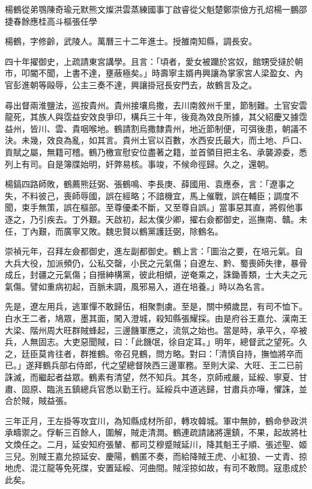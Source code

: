 
\begin{pinyinscope}
楊鶴從弟鶚陳奇瑜元默熊文燦洪雲蒸練國事丁啟睿從父魁楚鄭崇儉方孔炤楊一鵬邵捷春餘應桂高斗樞張任學

楊鶴，字修齡，武陵人。萬曆三十二年進士。授雒南知縣，調長安。

四十年擢御史，上疏請東宮講學。且言：「頃者，愛女被躪於宮奴，館甥受撻於朝市，叩閽不聞，上書不達，壅蔽極矣。」時壽寧主婿冉興讓為掌家宮人梁盈女、內官彭進朝等毆辱，公主三奏不達，興讓掛冠長安門去，故鶴言及之。

尋出督兩淮鹽法，巡按貴州。貴州接壤烏撒，去川南敘州千里，節制難。土官安雲龍死，其族人與霑益安效良爭印，構兵三十年，後竟為效良所據，其父紹慶又據霑益州，皆川、雲、貴咽喉地。鶴請割烏撒隸貴州，地近節制便，可弭後患，朝議不決。未幾，效良為亂，如其言。貴州土官以百數，水西安氏最大，而土地、戶口、貢賦之屬，無籍可稽。鶴乃檄宣慰安位盡著之籍，並首領目把主名、承襲源委，悉列上有司。自是簿牒始明，奸弊易核。事竣，不候命徑歸。久之，還朝。

楊鎬四路師敗，鶴薦熊廷弼、張鶴鳴、李長庚、薛國用、袁應泰，言：「遼事之失，不料彼己，喪師辱國，誤在經略；不諳機宜，馬上催戰，誤在輔臣；調度不聞，束手無策，誤在樞部。至尊優柔不斷，又至尊自誤。」當事惡其直，將假他事逐之，乃引疾去。丁外艱。天啟初，起太僕少卿，擢右僉都御史，巡撫南、贛。未任，丁內艱，而廣寧又敗。魏忠賢以鶴黨護廷弼，除鶴名。

崇禎元年，召拜左僉都御史，進左副都御史。鶴上言：「圖治之要，在培元氣。自大兵大役，加派頻仍，公私交罄，小民之元氣傷；自遼左、黔、蜀喪師失律，暴骨成丘，封疆之元氣傷；自搢紳構黨，彼此相傾，逆奄乘之，誅鋤善類，士大夫之元氣傷。譬如重病初起，百脈未調，風邪易入，道在培養。」時以為名言。

先是，遼左用兵，逃軍憚不敢歸伍，相聚剽虜。至是，關中頻歲昆，有司不恤下。白水王二者，鳩眾，墨其面，闖入澄城，殺知縣張耀採。由是府谷王嘉允、漢南王大梁、階州周大旺群賊蜂起，三邊饑軍應之，流氛之始也。當是時，承平久，卒被兵，人無固志。大吏惡聞賊，曰：「此饑氓，徐自定耳。」明年，總督武之望死。久之，廷臣莫肯往者，群推鶴。帝召見鶴，問方略。對曰：「清慎自持，撫恤將卒而已。」遂拜鶴兵部右侍郎，代之望總督陜西三邊軍務。至則大梁、大旺、王二已前誅滅，而繼起者益眾。鶴素有清望，然不知兵。其冬，京師戒嚴，延綏、寧夏、甘肅、固原、臨洮五鎮總兵官悉以勤王行。延綏兵中道逃歸，甘肅兵亦嘩，懼誅，並合於賊，賊益張。

三年正月，王左掛等攻宜川，為知縣成材所卻，轉攻韓城。軍中無帥，鶴命參政洪承疇禦之。俘斬三百餘人，圍解，賊走清澗。鶴連疏請諸將還鎮，不果，起故將杜文煥任之。二月，延安知府張輦、都司艾穆蹙賊延川，降其魁王子順、張述聖、姬三兒。別賊王嘉允掠延安、慶陽，鶴匿不奏，而給降賊王虎、小紅狼、一丈青、掠地虎、混江龍等免死牒，安置延綏、河曲間。賊淫掠如故，有司不敢問。寇患成於此矣。


\end{pinyinscope}
